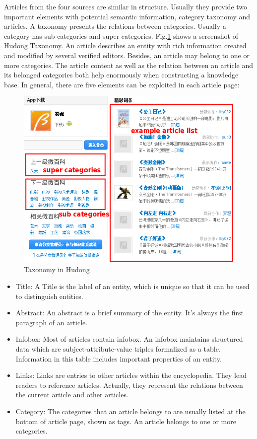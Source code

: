 \documentclass[runningheads,a4paper]{llncs}
\begin{document}
Articles from the four sources are similar in structure. Usually they provide two important elements with potential semantic information, category taxonomy and articles. A taxonomy presents the relations between categories. Usually a category has sub-categories and super-categories. Fig.\ref{fig:hudong-taxonomy} shows a screenshot of Hudong Taxonomy. An article describes an entity with rich information created and modified by several verified editors. Besides, an article may belong to one or more categories. The article content as well as the relation between an article and its belonged categories both help enormously when constructing a knowledge base. In general, there are five elements can be exploited in each article page:
\begin{figure}
    \centering
    \begin{minipage}[t]{0.8\textwidth}
        \centerline{\includegraphics[width=0.8\columnwidth]{fig/hudong-taxonomy2}}
        \caption{Taxonomy in Hudong}
        \label{fig:hudong-taxonomy}
    \end{minipage}%
\end{figure}
\begin{itemize}
  \item Title: A Title is the label of an entity, which is unique so that it can be used to distinguish entities.
  \item Abstract: An abstract is a brief summary of the entity. It's always the first paragraph of an article. 
  \item Infobox: Most of articles contain infobox. An infobox maintains structured data which are subject-attribute-value triples formalized as a table. Information in this table includes important properties of an entity.
  \item Links: Links are entries to other articles within the encyclopedia. They lead readers to reference articles. Actually, they represent the relations between the current article and other articles.
  \item Category: The categories that an article belongs to are usually listed at the bottom of article page, shown as tags. An article belongs to one or more categories.
\end{itemize}
\end{document}
